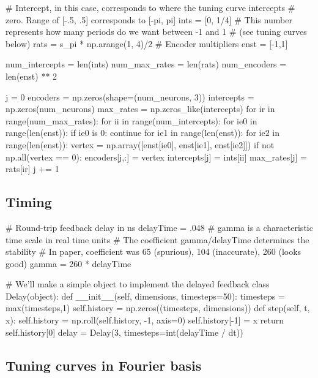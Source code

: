 \documentclass{report}
\begin{document}
\begin{python}
# Intercept, in this case, corresponds to where the tuning curve intercepts
# zero. Range of [-.5, .5] corresponds to [-pi, pi]
ints = [0, 1/4]
# This number represents how many periods do we want between -1 and 1
# (see tuning curves below)
rats = s_pi * np.arange(1, 4)/2
# Encoder multipliers
enst = [-1,1]

num_intercepts = len(ints)
num_max_rates = len(rats)
num_encoders = len(enst) ** 2

j = 0
encoders = np.zeros(shape=(num_neurons, 3))
intercepts = np.zeros(num_neurons)
max_rates = np.zeros_like(intercepts)
for ir in range(num_max_rates):
    for ii in range(num_intercepts):
        for ie0 in range(len(enst)):
            if ie0 is 0:
                continue
            for ie1 in range(len(enst)):
                for ie2 in range(len(enst)):
                    vertex = np.array([enst[ie0], enst[ie1], enst[ie2]])
                    if not np.all(vertex == 0):
                        encoders[j,:] = vertex
                        intercepts[j] = ints[ii]
                        max_rates[j] = rats[ir]
                        j += 1
\end{python}

\subsection{Timing}
\begin{python}
# Round-trip feedback delay in ns
delayTime = .048
# gamma is a characteristic time scale in real time units
# The coefficient gamma/delayTime determines the stability
# In paper, coefficient was 65 (spurious), 104 (inaccurate), 260 (looks good)
gamma = 260 * delayTime

# We'll make a simple object to implement the delayed feedback
class Delay(object):
    def __init__(self, dimensions, timesteps=50):
        timesteps = max(timesteps,1)
        self.history = np.zeros((timesteps, dimensions))
    def step(self, t, x):
        self.history = np.roll(self.history, -1, axis=0)
        self.history[-1] = x
        return self.history[0]
delay = Delay(3, timesteps=int(delayTime / dt))
\end{python}


\subsection{Tuning curves in Fourier
basis}\label{tuning-curves-in-fourier-basis}
\end{document}
